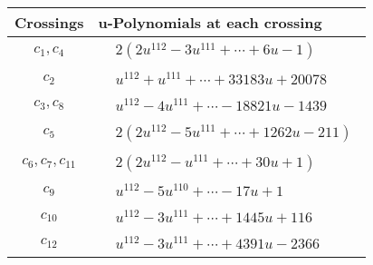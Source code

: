\documentclass[1p]{elsarticle_modified}
\theoremstyle{definition}
\begin{document}
\begin{tabular}{m{50pt}|m{274pt}}
Crossings & \hspace{64pt}u-Polynomials at each crossing \\
\hline $$\begin{aligned}c_{1},c_{4}\end{aligned}$$&$\begin{aligned}
&2(2 u^{112}-3 u^{111}+\cdots+6 u-1)
\end{aligned}$\\
\hline $$\begin{aligned}c_{2}\end{aligned}$$&$\begin{aligned}
&u^{112}+u^{111}+\cdots+33183 u+20078
\end{aligned}$\\
\hline $$\begin{aligned}c_{3},c_{8}\end{aligned}$$&$\begin{aligned}
&u^{112}-4 u^{111}+\cdots-18821 u-1439
\end{aligned}$\\
\hline $$\begin{aligned}c_{5}\end{aligned}$$&$\begin{aligned}
&2(2 u^{112}-5 u^{111}+\cdots+1262 u-211)
\end{aligned}$\\
\hline $$\begin{aligned}c_{6},c_{7},c_{11}\end{aligned}$$&$\begin{aligned}
&2(2 u^{112}- u^{111}+\cdots+30 u+1)
\end{aligned}$\\
\hline $$\begin{aligned}c_{9}\end{aligned}$$&$\begin{aligned}
&u^{112}-5 u^{110}+\cdots-17 u+1
\end{aligned}$\\
\hline $$\begin{aligned}c_{10}\end{aligned}$$&$\begin{aligned}
&u^{112}-3 u^{111}+\cdots+1445 u+116
\end{aligned}$\\
\hline $$\begin{aligned}c_{12}\end{aligned}$$&$\begin{aligned}
&u^{112}-3 u^{111}+\cdots+4391 u-2366
\end{aligned}$\\
\hline
\end{tabular}\\~\\
\end{document}
